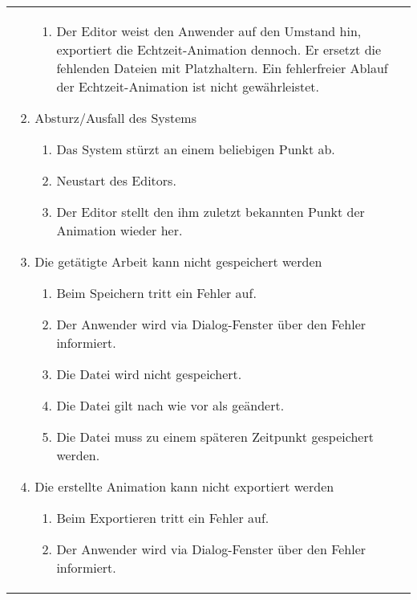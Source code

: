 \begin{longtabu}{p{0.5\textwidth}p{0.5\textwidth}}
\begin{enumerate}[label= (\alph*)]
{\begin{enumerate}[label= (\roman*)]
                    \item{Der Editor weist den Anwender auf den Umstand
                            hin, exportiert die Echtzeit-Animation dennoch. Er
                            ersetzt die fehlenden Dateien mit
                            Platzhaltern. Ein fehlerfreier Ablauf der
                            Echtzeit-Animation ist nicht gewährleistet.}
                \end{enumerate}
            }
            \item{Absturz/Ausfall des Systems
                \begin{enumerate}[label= (\roman*)]
                        \item{Das System stürzt an einem beliebigen Punkt
                                ab.}
                        \item{Neustart des Editors.}
                        \item{Der Editor stellt den ihm zuletzt bekannten
                                Punkt der Animation wieder her.}
                \end{enumerate}
            }
            \item{Die getätigte Arbeit kann nicht gespeichert werden
                    \begin{enumerate}[label= (\roman*)]
                        \item{Beim Speichern tritt ein Fehler auf.}
                        \item{Der Anwender wird via Dialog-Fenster über den Fehler
                                informiert.}
                        \item{Die Datei wird nicht gespeichert.}
                        \item{Die Datei gilt nach wie vor als geändert.}
                        \item{Die Datei muss zu einem späteren Zeitpunkt
                                gespeichert werden.}
                    \end{enumerate}
                }
            \item{Die erstellte Animation kann nicht exportiert werden
                    \begin{enumerate}[label= (\roman*)]
                        \item{Beim Exportieren tritt ein Fehler auf.}
                        \item{Der Anwender wird via Dialog-Fenster über den Fehler
                                informiert.}

\end{enumerate}}
\end{enumerate}
\end{longtabu}
